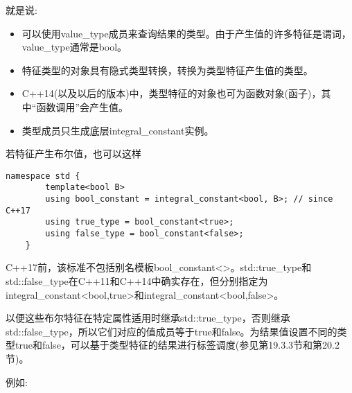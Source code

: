 就是说:

\begin{itemize}
\item 
可以使用value\_type成员来查询结果的类型。由于产生值的许多特征是谓词，value\_type通常是bool。

\item 
特征类型的对象具有隐式类型转换，转换为类型特征产生值的类型。

\item 
C++14(以及以后的版本)中，类型特征的对象也可为函数对象(函子)，其中“函数调用”会产生值。

\item 
类型成员只生成底层integral\_constant实例。
\end{itemize}

若特征产生布尔值，也可以这样

\begin{lstlisting}[style=styleCXX]
	namespace std {
		template<bool B>
		using bool_constant = integral_constant<bool, B>; // since C++17
		using true_type = bool_constant<true>;
		using false_type = bool_constant<false>;
	}
\end{lstlisting}

\begin{tcolorbox}[colback=webgreen!5!white,colframe=webgreen!75!black]
\hspace*{0.75cm}C++17前，该标准不包括别名模板bool\_constant<>。std::true\_type和std::false\_type在C++11和C++14中确实存在，但分别指定为integral\_constant<bool,true>和integral\_constant<bool,false>。
\end{tcolorbox}

以便这些布尔特征在特定属性适用时继承std::true\_type，否则继承std::false\_type，所以它们对应的值成员等于true和false。为结果值设置不同的类型true和false，可以基于类型特征的结果进行标签调度(参见第19.3.3节和第20.2节)。

例如:

